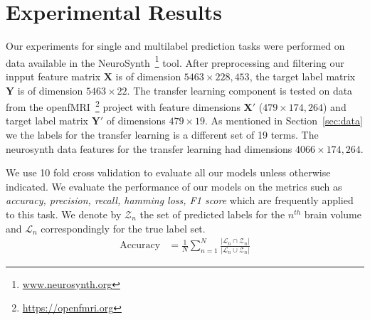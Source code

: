 \documentclass{article} %
\begin{document}
\section{Experimental Results} \label{sec:expt}

Our experiments for single and multilabel prediction tasks were performed on data available in the NeuroSynth~\footnote{\protect \url{www.neurosynth.org}} tool. After preprocessing and filtering our inpput feature matrix  $\mathbf{X}$ is of dimension $5463 \times 228,453$, the target label matrix $\mathbf{Y}$ is of dimension $5463 \times 22$. The transfer learning component is tested on data from the openfMRI~\footnote{\protect \url{https://openfmri.org}} project with feature dimensions $\mathbf{X}'$ ($479 \times 174,264$) and target label matrix $\mathbf{Y}'$ of dimensions $479 \times 19$. As mentioned in Section~\ref{sec:data} we the labels for the transfer learning is a different set of 19 terms. The neurosynth data features for the transfer learning had dimensions $4066 \times 174,264$.

We use 10 fold cross validation to evaluate all our models unless otherwise indicated. We evaluate the performance of our models on the metrics such as \textit{accuracy, precision, recall, hamming loss, F1 score} which are frequently applied to this task. We denote by $\mathcal{Z}_n$ the set of predicted labels for the $n^{th}$ brain volume and $\mathcal{L}_n$ correspondingly for the true label set.
\begin{align*}
 \text{Accuracy} &= \frac{1}{N} \displaystyle\sum_{n=1}^{N} \frac{|\mathcal{L}_n \cap \mathcal{Z}_n|}{|\mathcal{L}_n \cup \mathcal{Z}_n|} 
\end{align*}
\end{document}
